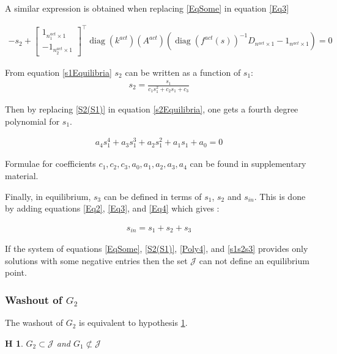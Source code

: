\documentclass[3p,times]{article}
\DeclareMathOperator{\diag}{diag}
\newtheorem{hypo}{H}
\begin{document}
A similar expression is obtained when replacing \eqref{EqSome} in equation \eqref{Eq3}

\begin{align}
\label{s2Equilibria}-s_2+
	\begin{bmatrix}
1_{n_1^{act}\times 1} \\-1_{n_2^{act}\times 1}
\end{bmatrix}^\top\diag (k^{act})(A^{act})(\diag(f^{act}(s))^{-1}D_{n^{act}\times 1}-1_{n^{act}\times 1}) = 0
\end{align}

From equation \eqref{s1Equilibria} $s_2$ can be written as a function of $s_1$:
\begin{align}
s_2 = \frac{s_1}{c_1s_1^2+c_2s_1+c_3} \label{S2(S1)}
\end{align}


Then by replacing  \eqref{S2(S1)} in equation \eqref{s2Equilibria}, one gets a fourth degree polynomial for $s_1$. 

\begin{align}
\label{Poly4} a_4s_1^4+a_3s_1^3+a_2s_1^2+a_1s_1+a_0 = 0
\end{align}


Formulae for coefficients $c_1, c_2, c_3, a_0, a_1, a_2, a_3, a_4$ can be found in supplementary material. 

Finally, in equilibrium, $s_3$ can be defined in terms of $s_1$, $s_2$ and $s_{in}$. This is done by adding equations \eqref{Eq2}, \eqref{Eq3},  and \eqref{Eq4} which gives :

\begin{align}
s_{in} = s_1+s_2+s_3 \label{s1s2s3}
\end{align}

If the system of equations \eqref{EqSome}, \eqref{S2(S1)}, \eqref{Poly4}, and \eqref{s1s2s3} provides only solutions with some negative entries then the set $\mathcal{J}$ can not define an equilibrium point.


\subsubsection{Washout of $G_2$}

The washout of $G_2$ is equivalent to  hypothesis \ref{hypothesis washout G2}.

\begin{hypo}
	$G_2 \subset \mathcal{J}$ and $G_1 \not \subset \mathcal{J}$
	\label{hypothesis washout G2}
\end{hypo} 
\end{document}
